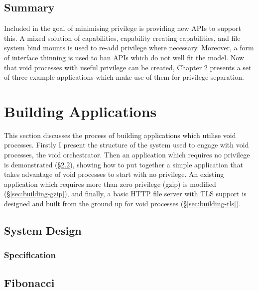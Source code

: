 \documentclass[12pt,a4paper,twoside]{report}
\begin{document}
\section{Summary}

Included in the goal of minimising privilege is providing new APIs to support this. A mixed solution of capabilities, capability creating capabilities, and file system bind mounts is used to re-add privilege where necessary. Moreover, a form of interface thinning is used to ban APIs which do not well fit the model. Now that void processes with useful privilege can be created, Chapter \ref{chap:building-apps} presents a set of three example applications which make use of them for privilege separation.


\chapter{Building Applications}
\label{chap:building-apps}

This section discusses the process of building applications which utilise void processes. Firstly I present the structure of the system used to engage with void processes, the void orchestrator. Then an application which requires no privilege is demonstrated (§\ref{sec:building-no-permissions}), showing how to put together a simple application that takes advantage of void processes to start with no privilege. An existing application which requires more than zero privilege (gzip) is modified (§\ref{sec:building-gzip}), and finally, a basic HTTP file server with TLS support is designed and built from the ground up for void processes (§\ref{sec:building-tls}).

\section{System Design}
\label{sec:system-design}


\subsection{Specification}
\label{sec:system-design-specification}


\section{Fibonacci}
\label{sec:building-no-permissions}
\end{document}
